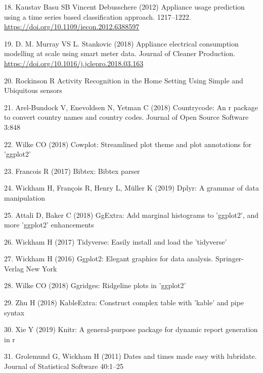 \documentclass[11pt,]{article}
\begin{document}
\leavevmode\hypertarget{ref-kaustavbasuApplianceUsagePrediction2012}{}%
18. Kaustav Basu SB Vincent Debusschere (2012) Appliance usage
prediction using a time series based classification approach.
1217--1222. \url{https://doi.org/10.1109/iecon.2012.6388597}

\leavevmode\hypertarget{ref-d.m.murrayApplianceElectricalConsumption2018}{}%
19. D. M. Murray VS L. Stankovic (2018) Appliance electrical consumption
modelling at scale using smart meter data. Journal of Cleaner
Production. \url{https://doi.org/10.1016/j.jclepro.2018.03.163}

\leavevmode\hypertarget{ref-rockinsonActivityRecognitionHome}{}%
20. Rockinson R Activity Recognition in the Home Setting Using Simple
and Ubiquitous sensors

\leavevmode\hypertarget{ref-countrycode}{}%
21. Arel-Bundock V, Enevoldsen N, Yetman C (2018) Countrycode: An r
package to convert country names and country codes. Journal of Open
Source Software 3:848

\leavevmode\hypertarget{ref-cowplot}{}%
22. Wilke CO (2018) Cowplot: Streamlined plot theme and plot annotations
for 'ggplot2'

\leavevmode\hypertarget{ref-bibtex}{}%
23. Francois R (2017) Bibtex: Bibtex parser

\leavevmode\hypertarget{ref-dplyr}{}%
24. Wickham H, François R, Henry L, Müller K (2019) Dplyr: A grammar of
data manipulation

\leavevmode\hypertarget{ref-ggExtra}{}%
25. Attali D, Baker C (2018) GgExtra: Add marginal histograms to
'ggplot2', and more 'ggplot2' enhancements

\leavevmode\hypertarget{ref-tidyverse}{}%
26. Wickham H (2017) Tidyverse: Easily install and load the 'tidyverse'

\leavevmode\hypertarget{ref-ggplot2}{}%
27. Wickham H (2016) Ggplot2: Elegant graphics for data analysis.
Springer-Verlag New York

\leavevmode\hypertarget{ref-ggridges}{}%
28. Wilke CO (2018) Ggridges: Ridgeline plots in 'ggplot2'

\leavevmode\hypertarget{ref-kableExtra}{}%
29. Zhu H (2018) KableExtra: Construct complex table with 'kable' and
pipe syntax

\leavevmode\hypertarget{ref-knitr1}{}%
30. Xie Y (2019) Knitr: A general-purpose package for dynamic report
generation in r

\leavevmode\hypertarget{ref-lubridate}{}%
31. Grolemund G, Wickham H (2011) Dates and times made easy with
lubridate. Journal of Statistical Software 40:1--25
\end{document}
